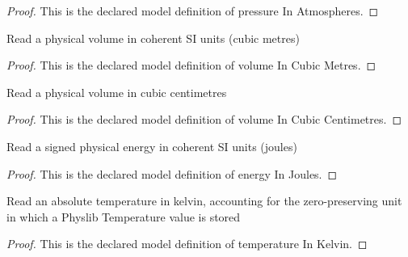 \begin{proof}
  This is the declared model definition of pressure In Atmospheres.
\end{proof}
\begin{definition}
  \label{def:physics:phyx-mini-0411:phyxminiproblems-problemphyxmini0411-volumeincubicmetres}
  Read a physical volume in coherent SI units (cubic metres)
\end{definition}
\begin{proof}
  This is the declared model definition of volume In Cubic Metres.
\end{proof}
\begin{definition}
  \label{def:physics:phyx-mini-0411:phyxminiproblems-problemphyxmini0411-volumeincubiccentimetres}
  Read a physical volume in cubic centimetres
\end{definition}
\begin{proof}
  This is the declared model definition of volume In Cubic Centimetres.
\end{proof}
\begin{definition}
  \label{def:physics:phyx-mini-0411:phyxminiproblems-problemphyxmini0411-energyinjoules}
  Read a signed physical energy in coherent SI units (joules)
\end{definition}
\begin{proof}
  This is the declared model definition of energy In Joules.
\end{proof}
\begin{definition}
  \label{def:physics:phyx-mini-0411:phyxminiproblems-problemphyxmini0411-temperatureinkelvin}
  Read an absolute temperature in kelvin, accounting for the zero-preserving unit in which a Physlib Temperature value is stored
\end{definition}
\begin{proof}
  This is the declared model definition of temperature In Kelvin.
\end{proof}
